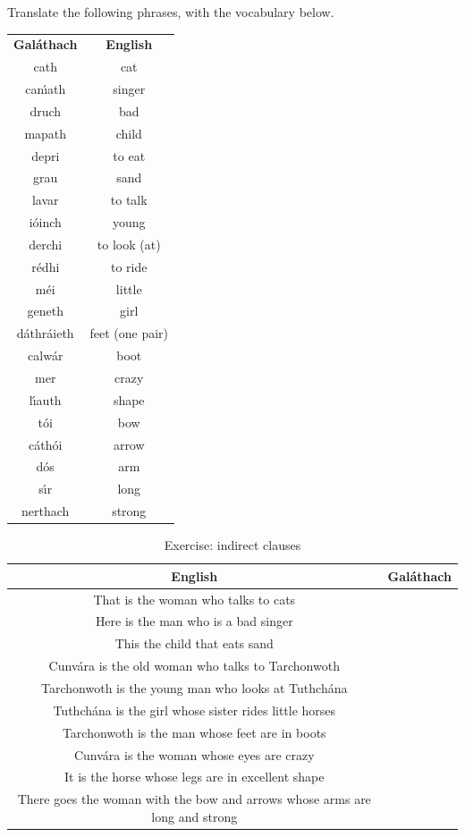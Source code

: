 Translate the following phrases, with the vocabulary below.
\begin{table}[H]
\centering
\begin{tabular}{cc}
  \toprule
  \textbf{Gal\'{a}thach} & \textbf{English}\\
  \cmidrule(lr){1-1}\cmidrule(lr){2-2}
  cath & cat\\
  can\'{\i}ath & singer\\
  druch & bad\\
  mapath & child\\
  depri & to eat\\
  grau & sand\\
  lavar & to talk\\
  i\'{o}inch & young\\
  derchi & to look (at)\\
  r\'{e}dhi & to ride\\
  m\'{e}i & little\\
  geneth & girl\\
  d\'{a}thr\'{a}ieth & feet (one pair)\\
  calw\'{a}r & boot\\
  mer & crazy\\
  l\'{\i}auth & shape\\
  t\'{o}i & bow\\
  c\'{a}th\'{o}i & arrow\\
  d\'{o}s & arm\\
  s\'{\i}r & long\\
  nerthach & strong\\
  \bottomrule
\end{tabular}
\label{vocab_indirect_clauses}
\end{table}

\begin{table}[H]
\centering
\begin{tabular}{|c|M{5.0cm}|}
  \toprule
  \textbf{English} & \textbf{Gal\'{a}thach}\\
  \toprule
  That is the woman who talks to cats & \\
  \midrule
  Here is the man who is a bad singer & \\
  \midrule
  This the child that eats sand & \\
  \midrule
  Cunv\'{a}ra is the old woman who talks to Tarchonwoth & \\
  \midrule
  Tarchonwoth is the young man who looks at Tuthch\'{a}na & \\
  \midrule
  Tuthch\'{a}na is the girl whose sister rides little horses & \\
  \midrule
  Tarchonwoth is the man whose feet are in boots & \\
  \midrule
  Cunv\'{a}ra is the woman whose eyes are crazy & \\
  \midrule
  It is the horse whose legs are in excellent shape & \\
  \midrule
  There goes the woman with the bow and arrows whose arms are long and strong & \\
  \bottomrule
\end{tabular}
\label{exercise_indirect_clauses}
\caption{Exercise: indirect clauses}
\end{table}

